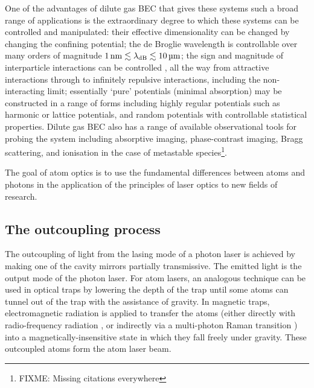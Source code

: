 

One of the advantages of dilute gas BEC that gives these systems such a broad range of applications is the extraordinary degree to which these systems can be controlled and manipulated:  their effective dimensionality can be changed by changing the confining potential; the de Broglie wavelength is controllable over many orders of magnitude $\unit[1]{nm} \lesssim \lambda_\text{dB} \lesssim \unit[10]{\micro m}$; the sign and magnitude of interparticle interactions can be controlled \citep{Inouye:1998hy}, all the way from attractive interactions through to infinitely repulsive interactions, including the non-interacting limit; essentially `pure' potentials (minimal absorption) may be constructed in a range of forms including highly regular potentials such as harmonic or lattice potentials, and random potentials with controllable statistical properties.  Dilute gas BEC also has a range of available observational tools for probing the system including absorptive imaging, phase-contrast imaging, Bragg scattering, and ionisation in the case of metastable species\footnote{FIXME: Missing citations everywhere}.  

The goal of atom optics is to use the fundamental differences between atoms and photons in the application of the principles of laser optics to new fields of research.

\subsection{The outcoupling process}

The outcoupling of light from the lasing mode of a photon laser is achieved by making one of the cavity mirrors partially transmissive.  The emitted light is the output mode of the photon laser.  For atom lasers, an analogous technique can be used in optical traps by lowering the depth of the trap until some atoms can tunnel out of the trap with the assistance of gravity.  In magnetic traps, electromagnetic radiation is applied to transfer the atoms (either directly with radio-frequency radiation \citep{Mewes:1997,Bloch:1999mi}, or indirectly via a multi-photon Raman transition \citep{Moy:1997,Hagley:1999dz,Robins:2006fk}) into a magnetically-insensitive state in which they fall freely under gravity.  These outcoupled atoms form the atom laser beam.


